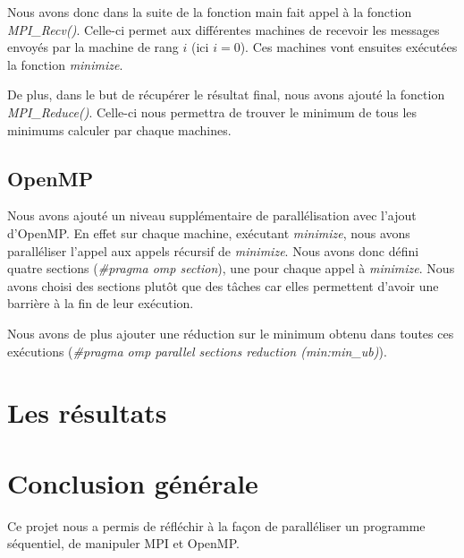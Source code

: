 \documentclass[a4paper,10pt]{article}
\begin{document}
Nous avons donc dans la suite de la fonction main fait appel à la fonction \emph{MPI\_Recv()}. Celle-ci permet aux différentes machines de recevoir les messages envoyés par la machine de rang $i$ (ici $i=0$). Ces machines vont ensuites exécutées la fonction \emph{minimize}.

De plus, dans le but de récupérer le résultat final, nous avons ajouté la fonction \emph{MPI\_Reduce()}. Celle-ci nous permettra de trouver le minimum de tous les minimums calculer par chaque machines.

\subsection{OpenMP}
Nous avons ajouté un niveau supplémentaire de parallélisation avec l'ajout d'OpenMP. En effet sur chaque machine, exécutant \emph{minimize}, nous avons paralléliser l'appel aux appels récursif de \emph{minimize}.
Nous avons donc défini quatre sections (\emph{\#pragma omp section}), une pour chaque appel à \emph{minimize}. Nous avons choisi des sections plutôt que des tâches car elles permettent d'avoir une barrière à la fin de leur exécution.

Nous avons de plus ajouter une réduction sur le minimum obtenu dans toutes ces exécutions (\emph{\#pragma omp parallel sections reduction (min:min\_ub)}).


\newpage
\section{Les résultats}





\newpage
\section{Conclusion générale}
Ce projet nous a permis de réfléchir à la façon de paralléliser un programme séquentiel, de manipuler MPI et OpenMP.
\end{document}
